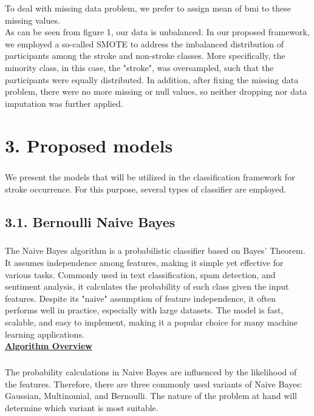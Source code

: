 \documentclass[a4paper]{report}
\begin{document}
	To deal with missing data problem, we prefer to assign mean of bmi to these missing values. \\
	
	
	As can be seen from figure 1, our data is unbalanced. In our proposed framework, we employed a so-called SMOTE \cite{smote} to address the imbalanced distribution of participants among the stroke and non-stroke classes. More specifically, the minority class, in this case, the "stroke", was oversampled, such that the participants were equally distributed. In addition, after fixing the missing data problem, there were no more missing or null values, so neither dropping nor data imputation was further applied.
	
	\chapter*{\huge 3. Proposed models} \Large
	\paragraph{}
	We present the models that will be utilized in the classification framework for stroke occurrence. For this purpose, several types of classifier are employed.
	
	\section*{\Large 3.1. Bernoulli Naive Bayes} \Large
	\paragraph{}
	The Naive Bayes algorithm is a probabilistic classifier based on Bayes' Theorem. It assumes independence among features, making it simple yet effective for various tasks. Commonly used in text classification, spam detection, and sentiment analysis, it calculates the probability of each class given the input features. Despite its "naive" assumption of feature independence, it often performs well in practice, especially with large datasets. The model is fast, scalable, and easy to implement, making it a popular choice for many machine learning applications. \\
	
	\underline{\textbf{\Large Algorithm Overview}}
	\paragraph{}
	The probability calculations in Naive Bayes are influenced by the likelihood of the features. Therefore, there are three commonly used variants of Naive Bayes: Gaussian, Multinomial, and Bernoulli. The nature of the problem at hand will determine which variant is most suitable.
	
\end{document}
